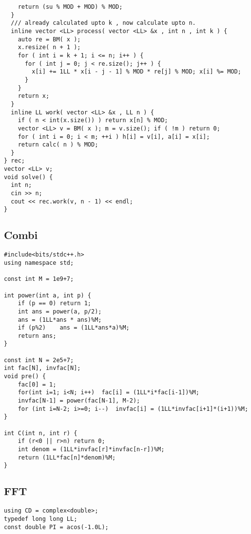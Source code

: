 \documentclass[FSZ,a4paper,onesided]{article}
\begin{document}
\begin{multicols*}{\COLS}
\begin{lstlisting}
    return (su % MOD + MOD) % MOD;
  }
  /// already calculated upto k , now calculate upto n.
  inline vector <LL> process( vector <LL> &x , int n , int k ) {
    auto re = BM( x );
    x.resize( n + 1 );
    for ( int i = k + 1; i <= n; i++ ) {
      for ( int j = 0; j < re.size(); j++ ) {
        x[i] += 1LL * x[i - j - 1] % MOD * re[j] % MOD; x[i] %= MOD;
      }
    }
    return x;
  }
  inline LL work( vector <LL> &x , LL n ) {
    if ( n < int(x.size()) ) return x[n] % MOD;
    vector <LL> v = BM( x ); m = v.size(); if ( !m ) return 0;
    for ( int i = 0; i < m; ++i ) h[i] = v[i], a[i] = x[i];
    return calc( n ) % MOD;
  }
} rec;
vector <LL> v;
void solve() {
  int n;
  cin >> n;
  cout << rec.work(v, n - 1) << endl;
}

\end{lstlisting}
\subsection{Combi}
\begin{lstlisting}
#include<bits/stdc++.h>
using namespace std;

const int M = 1e9+7;

int power(int a, int p) {
    if (p == 0) return 1;
    int ans = power(a, p/2);
    ans = (1LL*ans * ans)%M;
    if (p%2)    ans = (1LL*ans*a)%M;
    return ans;
}

const int N = 2e5+7;
int fac[N], invfac[N];
void pre() {
    fac[0] = 1;
    for(int i=1; i<N; i++)  fac[i] = (1LL*i*fac[i-1])%M;
    invfac[N-1] = power(fac[N-1], M-2);
    for (int i=N-2; i>=0; i--)  invfac[i] = (1LL*invfac[i+1]*(i+1))%M;
}

int C(int n, int r) {
    if (r<0 || r>n) return 0;
    int denom = (1LL*invfac[r]*invfac[n-r])%M;
    return (1LL*fac[n]*denom)%M;
}
\end{lstlisting}
\subsection{FFT}
\begin{lstlisting}
using CD = complex<double>;
typedef long long LL;
const double PI = acos(-1.0L);


\end{lstlisting}
\end{multicols*}
\end{document}
